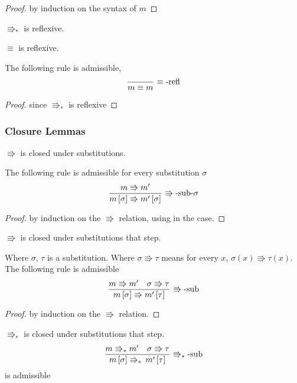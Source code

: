 \begin{proof}
by induction on the syntax of $m$
\end{proof}
\begin{fact}
$\Rrightarrow_{\ast}$ is reflexive.
\end{fact}

\begin{lem}
$\equiv$ is reflexive.

The following rule is admissible,
\[
\frac{\,}{m\equiv m}\,\operatorname{\equiv-refl}
\]
\end{lem}

\begin{proof}
since $\Rrightarrow_{\ast}$ is reflexive
\end{proof}

\subsubsection{Closure Lemmas}
\begin{lem}
$\Rrightarrow$ is closed under substitutions.

The following rule is admissible for every substitution $\sigma$
\[
\frac{m\Rrightarrow m'}{m\left[\sigma\right]\Rrightarrow m'\left[\sigma\right]}\,\operatorname{\Rrightarrow-sub-\sigma}
\]
\end{lem}


\begin{proof}
by induction on the $\Rrightarrow$ relation, using 
in the  case.
\end{proof}
\begin{lem}
$\Rrightarrow$ is closed under substitutions that step.

Where $\sigma$, $\tau$ is a substitution.
Where $\sigma\Rrightarrow\tau$ means for every $x$, $\sigma\left(x\right)\Rrightarrow\tau\left(x\right)$.
The following rule is admissible
\[
\frac{m\Rrightarrow m'\quad\sigma\Rrightarrow\tau}{m\left[\sigma\right]\Rrightarrow m'\left[\tau\right]}\,\operatorname{\Rrightarrow-sub}
\]
\end{lem}
\begin{proof}
by induction on the $\Rrightarrow$ relation.
\end{proof}

\begin{lem}
$\Rrightarrow_{\ast}$ is closed under substitutions that step.
\[
\frac{m\Rrightarrow_{\ast}m'\quad\sigma\Rrightarrow\tau}{m\left[\sigma\right]\Rrightarrow_{\ast}\,m'\left[\tau\right]}\,\operatorname{\Rrightarrow_{\ast}-sub}
\]
is admissible 
\end{lem}


